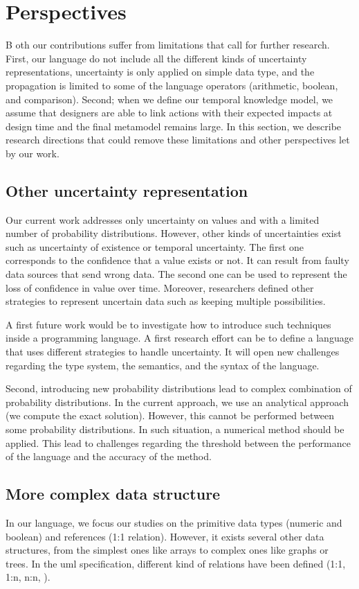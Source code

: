 \section{Perspectives}
B oth our contributions suffer from limitations that call for further research.
First, our language \langName{} do not include all the different kinds of uncertainty representations, uncertainty is only applied on simple data type, and the propagation is limited to some of the language operators (arithmetic, boolean, and comparison).
Second; when we define our temporal knowledge model, we assume that designers are able to link actions with their expected impacts at design time and the final \gls{metamodel} remains large.
In this section, we describe research directions that could remove these limitations and other perspectives let by our work.


\subsection{Other uncertainty representation}
Our current work addresses only uncertainty on values and with a limited number of probability distributions.
However, other kinds of uncertainties exist such as uncertainty of existence or temporal uncertainty.
The first one corresponds to the confidence that a value exists or not.
It can result from faulty data sources that send wrong data.
The second one can be used to represent the loss of confidence in value over time.
Moreover, researchers defined other strategies to represent uncertain data such as keeping multiple possibilities.

A first future work would be to investigate how to introduce such techniques inside a programming language.
A first research effort can be to define a language that uses different strategies to handle uncertainty.
It will open new challenges regarding the type system, the semantics, and the syntax of the language.

Second, introducing new probability distributions lead to complex combination of probability distributions.
In the current approach, we use an analytical approach (we compute the exact solution).
However, this cannot be performed between some probability distributions.
In such situation, a numerical method should be applied.
This lead to challenges regarding the threshold between the performance of the language and the accuracy of the method.

\subsection{More complex data structure}
In our language, we focus our studies on the primitive data types (numeric and boolean) and references (1:1 relation).
However, it exists several other data structures, from the simplest ones like arrays to complex ones like graphs or trees.
In the \gls{uml} specification, different kind of relations have been defined (1:1, 1:n, n:n, \etc).

